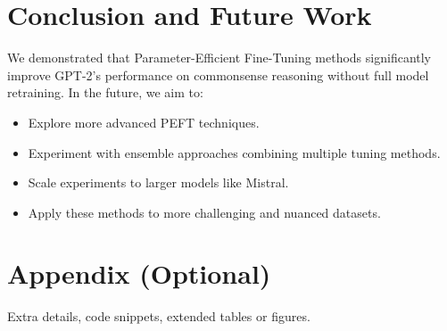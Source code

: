\documentclass[11pt,twocolumn]{article}
\begin{document}
\section{Conclusion and Future Work}
\label{sec:conclusion}
We demonstrated that Parameter-Efficient Fine-Tuning methods significantly improve GPT-2's performance on commonsense reasoning without full model retraining. In the future, we aim to:
\begin{itemize}
    \item Explore more advanced PEFT techniques.
    \item Experiment with ensemble approaches combining multiple tuning methods.
    \item Scale experiments to larger models like Mistral.
    \item Apply these methods to more challenging and nuanced datasets.
\end{itemize}



\printbibliography[
heading=bibintoc,
title={Whole bibliography}
]

\appendix
\section{Appendix (Optional)}
Extra details, code snippets, extended tables or figures.
\end{document}
